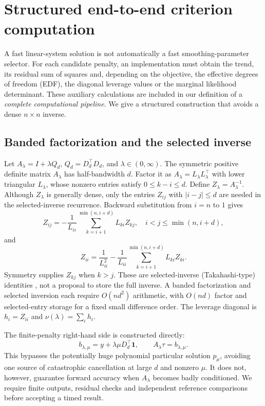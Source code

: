 \section{Structured end-to-end criterion computation}\label{sec:structured}
A fast linear-system solution is not automatically a fast smoothing-parameter selector. For each candidate penalty, an implementation must obtain the trend, its residual sum of squares and, depending on the objective, the effective degrees of freedom (EDF), the diagonal leverage values or the marginal likelihood determinant. These auxiliary calculations are included in our definition of a \emph{complete computational pipeline}. We give a structured construction that avoids a dense $n\times n$ inverse.

\subsection{Banded factorization and the selected inverse}
Let $A_\lambda=I+\lambda Q_d$, $Q_d=D_d^\top D_d$, and $\lambda\in(0,\infty)$. The symmetric positive definite matrix $A_\lambda$ has half-bandwidth $d$. Factor it as $A_\lambda=L_\lambda L_\lambda^\top$ with lower triangular $L_\lambda$, whose nonzero entries satisfy $0\leq k-i\leq d$. Define $Z_\lambda=A_\lambda^{-1}$. Although $Z_\lambda$ is generally dense, only the entries $Z_{ij}$ with $|i-j|\leq d$ are needed in the selected-inverse recurrence. Backward substitution from $i=n$ to $1$ gives
\begin{equation}\label{eq:seloff}
Z_{ij}=-\frac{1}{L_{ii}}
\sum_{k=i+1}^{\min(n,i+d)}
L_{ki}Z_{kj},\quad i<j\leq \min(n,i+d),
\end{equation}
and
\begin{equation}\label{eq:seldiag}
Z_{ii}=\frac{1}{L_{ii}^2}
-\frac{1}{L_{ii}}\sum_{k=i+1}^{\min(n,i+d)}
L_{ki}Z_{ki}.
\end{equation}
Symmetry supplies $Z_{kj}$ when $k>j$. These are selected-inverse (Takahashi-type) identities \citep{erisman1975}, not a proposal to store the full inverse. A banded factorization and selected inversion each require $O(nd^2)$ arithmetic, with $O(nd)$ factor and selected-entry storage for a fixed small difference order. The leverage diagonal is $h_i=Z_{ii}$ and $\nu(\lambda)=\sum_i h_i$.

The finite-penalty right-hand side is constructed directly:
\begin{equation}\label{eq:direct_rhs}
b_{\lambda,\mu}=y+\lambda\mu D_d^\top\mathbf1,
\qquad A_\lambda\widehat\tau=b_{\lambda,\mu}.
\end{equation}
This bypasses the potentially huge polynomial particular solution $p_\mu$, avoiding one source of catastrophic cancellation at large $d$ and nonzero $\mu$. It does not, however, guarantee forward accuracy when $A_\lambda$ becomes badly conditioned. We require finite outputs, residual checks and independent reference comparisons before accepting a timed result.

